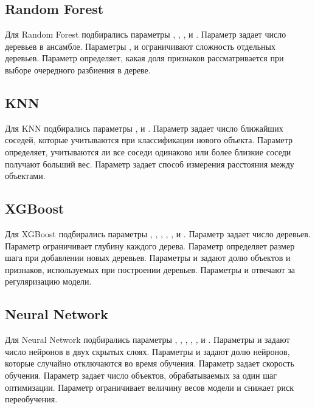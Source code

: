 \documentclass[14pt,a4paper]{extreport}
\begin{document}
\subsection{Random Forest}

Для Random Forest подбирались параметры , , ,  и . Параметр  задает число деревьев в ансамбле. Параметры ,  и  ограничивают сложность отдельных деревьев. Параметр  определяет, какая доля признаков рассматривается при выборе очередного разбиения в дереве.

\subsection{KNN}

Для KNN подбирались параметры ,  и . Параметр  задает число ближайших соседей, которые учитываются при классификации нового объекта. Параметр  определяет, учитываются ли все соседи одинаково или более близкие соседи получают больший вес. Параметр  задает способ измерения расстояния между объектами.

\subsection{XGBoost}

Для XGBoost подбирались параметры , , , , ,  и . Параметр  задает число деревьев. Параметр  ограничивает глубину каждого дерева. Параметр  определяет размер шага при добавлении новых деревьев. Параметры  и  задают долю объектов и признаков, используемых при построении деревьев. Параметры  и  отвечают за регуляризацию модели.

\subsection{Neural Network}

Для Neural Network подбирались параметры , , , , ,  и . Параметры  и  задают число нейронов в двух скрытых слоях. Параметры  и  задают долю нейронов, которые случайно отключаются во время обучения. Параметр  задает скорость обучения. Параметр  задает число объектов, обрабатываемых за один шаг оптимизации. Параметр  ограничивает величину весов модели и снижает риск переобучения.
\end{document}
